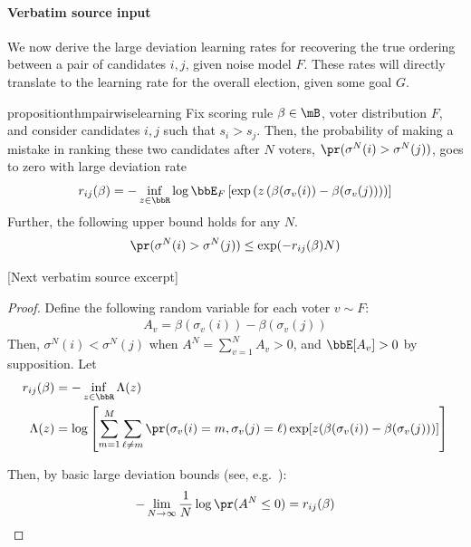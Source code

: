 \documentclass[10pt]{article}
\begin{document}
\paragraph{Verbatim source input}
\begin{ReviewVerbatim}
 We now derive the large deviation learning rates for recovering the true ordering between a pair of candidates $i,j$, given noise model $F$. These rates will directly translate to the learning rate for the overall election, given some goal $G$.


%

\begin{restatable}{proposition}{thmpairwiselearning}
	\label{thm:pairwiselearning}
	Fix scoring rule $\beta\in\mB$, voter distribution $F$, and consider candidates $i,j$ such that $s_i > s_j$. Then, the probability of making a mistake in ranking these two candidates after $N$ voters, $\pr(\sigma^N(i)>\sigma^N(j))$, goes to zero with large deviation rate
	\[r_{ij}(\beta) = -\inf_{z\in\bbR} \log \bbE_F\left[\exp\left(z\left(\beta(\sigma_v(i)) - \beta(\sigma_v(j))\right)\right)\right]\]
	Further, the following upper bound holds for any $N$.
	\[\pr(\sigma^N(i)>\sigma^N(j)) \leq \exp(-r_{ij}(\beta)N)\]
%
%
%
\end{restatable}

[Next verbatim source excerpt]

\thmpairwiselearning*
\begin{proof}

	Define the following random variable for each voter $v \sim F$:
	\begin{align*}
	A_v = \beta(\sigma_v(i)) - \beta(\sigma_v(j))
	\end{align*}
	Then, $\sigma^N(i) < \sigma^N(j)$ when $A^N = \sum_{v=1}^N A_v > 0$, and $\bbE[A_v]>0$ by supposition.
	Let
	\begin{align*}
		r_{ij}(\beta) &= -\inf_{z\in\bbR}{\Lambda(z)}\\
	\Lambda(z) &= \log \left[\sum_{m=1}^M \sum_{\ell\neq m} \pr(\sigma_v(i) = m, \sigma_v(j)=\ell) \exp[ z(\beta(\sigma_v(i)) - \beta(\sigma_v(j)))]   \right]
	\end{align*}

	Then, by basic large deviation bounds (see, e.g.~\citet{dembo_large_2010}):
	\begin{align*}
	-\lim_{N\to \infty} \frac{1}{N} \log \pr(A^N \leq 0) &= r_{ij}(\beta)\\
%
	\end{align*}



\end{proof}
\end{ReviewVerbatim}
\end{document}
